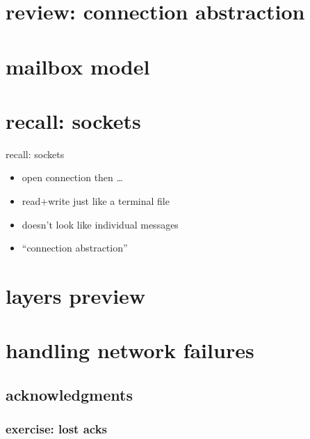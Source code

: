 

\section{review: connection abstraction}



\section{mailbox model}


\section{recall: sockets}

\begin{frame}{recall: sockets}
    \begin{itemize}
    \item open connection then \ldots \\
    \item read+write just like a terminal file
    \vspace{.5cm}
    \item doesn't look like individual messages
    \item ``connection abstraction''
    \end{itemize}
\end{frame}

\section{layers preview}


\section{handling network failures}


\subsection{acknowledgments}

\subsubsection{exercise: lost acks}

